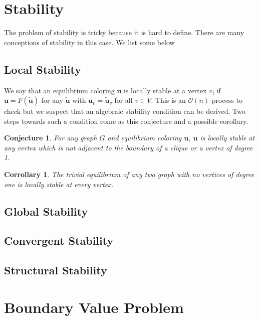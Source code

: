 \documentclass[]{article}
\newtheorem{conjecture}[theorem]{Conjecture}
\newtheorem{corrollary}[theorem]{Corrollary}
\begin{document}
\section{Stability}
The problem of stability is tricky because it is hard to define. There are many conceptions of stability in this case. We list some below
\subsection{Local Stability} We say that an equilibrium coloring $\mathbf{u}$ is locally stable at a vertex $v_i$ if $\mathbf{u}=F(\tilde{\mathbf{u}})$ for any $\tilde{\mathbf{u}}$ with $\mathbf{u}_{v}=\tilde{\mathbf{u}}_{v}$ for all $v\in V$. This is an $\mathcal{O}(n)$ process to check but we suspect that an algebraic stability condition can be derived. Two steps towards such a condition come as this conjecture and a possible corollary.
\begin{conjecture}
	For any graph $G$ and equilibrium coloring $\mathbf{u}$, $\mathbf{u}$ is locally stable at any vertex which is not adjacent to the boundary of a clique or a vertex of degree 1. 
\end{conjecture} 
\begin{corrollary}
	The trivial equilibrium of any two graph with no vertices of degree one is locally stable at every vertex.
\end{corrollary}
\subsection{Global Stability}
\subsection{Convergent Stability}
\subsection{Structural Stability}
\section{Boundary Value Problem}
\end{document}
